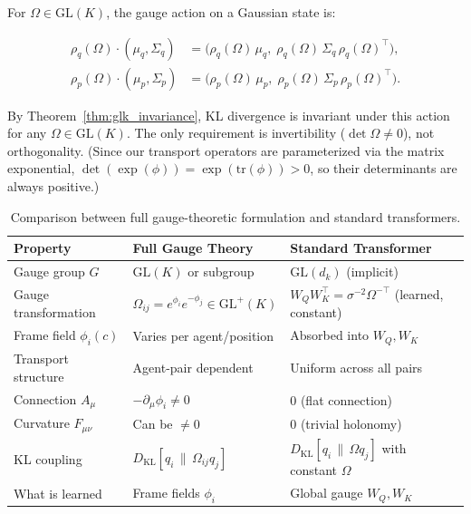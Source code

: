 \documentclass[twoside,11pt]{article}
\begin{document}
For $\Omega \in \mathrm{GL}(K)$, the gauge action on a Gaussian state is:

\begin{equation}
\boxed{
\begin{aligned}
\rho_q(\Omega) \cdot (\mu_q, \Sigma_q)
&= \big(\rho_q(\Omega)\,\mu_q,\;
\rho_q(\Omega)\,\Sigma_q\,\rho_q(\Omega)^\top\big),\\
\rho_p(\Omega) \cdot (\mu_p, \Sigma_p)
&= \big(\rho_p(\Omega)\,\mu_p,\;
\rho_p(\Omega)\,\Sigma_p\,\rho_p(\Omega)^\top\big).
\end{aligned}
}
\label{eq:gauge_action_gaussians}
\end{equation}

By Theorem~\ref{thm:glk_invariance}, KL divergence is invariant under this action for any $\Omega \in \mathrm{GL}(K)$. The only requirement is invertibility ($\det \Omega \neq 0$), not orthogonality. (Since our transport operators are parameterized via the matrix exponential, $\det(\exp(\phi)) = \exp(\mathrm{tr}(\phi)) > 0$, so their determinants are always positive.)







\begin{table}[h]
\centering
\renewcommand{\arraystretch}{1.2}
\setlength{\tabcolsep}{6pt}
\begin{tabularx}{\textwidth}{lXX}
\hline
\textbf{Property} &
\textbf{Full Gauge Theory} &
\textbf{Standard Transformer} \\
\hline
Gauge group $G$ &
$\mathrm{GL}(K)$ or subgroup &
$\mathrm{GL}(d_k)$ (implicit) \\
Gauge transformation &
$\Omega_{ij} = e^{\phi_i} e^{-\phi_j} \in \mathrm{GL}^+(K)$ &
$W_Q W_K^\top = \sigma^{-2}\Omega^{-\top}$ (learned, constant) \\
Frame field $\phi_i(c)$ &
Varies per agent/position &
Absorbed into $W_Q, W_K$ \\
Transport structure &
Agent-pair dependent &
Uniform across all pairs \\
Connection $A_\mu$ &
$-\partial_\mu \phi_i \neq 0$ &
$0$ (flat connection) \\
Curvature $F_{\mu\nu}$ &
Can be $\neq 0$ &
$0$ (trivial holonomy) \\
KL coupling &
$D_{\text{KL}}[q_i \,\|\, \Omega_{ij} q_j]$ &
$D_{\text{KL}}[q_i \,\|\, \Omega q_j]$ with constant $\Omega$ \\
What is learned &
Frame fields $\phi_i$ &
Global gauge $W_Q, W_K$ \\
\hline
\end{tabularx}
\caption{Comparison between full gauge-theoretic formulation and standard transformers.}
\label{tab:gauge_vs_transformer}
\end{table}
\end{document}
